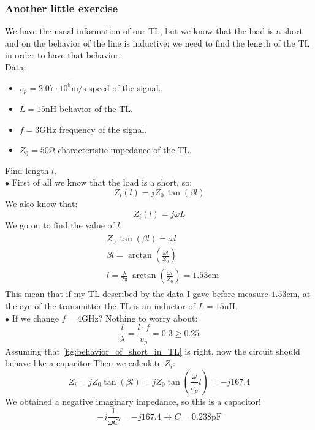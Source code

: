 \subsubsection*{Another little exercise}
We have the usual information of our TL, but we know that the load is a short and on the behavior of the line is inductive; we need to find the length of the TL in order to have that behavior.\\
Data:
\begin{itemize}
    \item $v_p=2.07\cdot 10^{8}\si{\metre \per \second}$ speed of the signal.
    \item $L=15\si{\nano\henry}$ behavior of the TL.
    \item $f=3\si{\giga\hertz}$ frequency of the signal.
    \item $Z_0=50\si{\ohm}$ characteristic impedance of the TL.
\end{itemize}
Find length $l$.\\
$\bullet$ First of all we know that the load is a short, so:
\begin{equation*}
    Z_i(l)=jZ_0\, \tan(\beta l)
\end{equation*}
We also know that:
\begin{equation*}
    Z_i(l)=j\omega L
\end{equation*}
We go on to find the value of $l$:
\begin{align*}
    \begin{split}
      &Z_0\,\tan(\beta l)=\omega l\\[5pt]
      &\beta l=\arctan(\frac{\omega l}{Z_0})\\[5pt]
      &l=\frac{\lambda}{2\pi}\,\arctan(\frac{\omega l}{Z_0})=1.53\si{\centi\metre}
    \end{split}
\end{align*}
This mean that if my TL described by the data I gave before measure $1.53\si{\centi\metre}$, at the eye of the transmitter the TL is an inductor of $L=15\si{\nano\henry}$.\\
$\bullet$ If we change $f=4\si{\giga\hertz}$? Nothing to worry about:
\begin{equation*}
    \frac{l}{\lambda}=\frac{l\cdot f}{v_p}=0.3\geq 0.25
\end{equation*}
Assuming that \cref{fig:behavior_of_short_in_TL} is right, now the circuit should behave like a capacitor
Then we calculate $Z_i$:
\begin{equation*}
    Z_i=jZ_0\tan(\beta l)=jZ_0\tan(\frac{\omega}{v_p} l)=-j167.4
\end{equation*}
We obtained a negative imaginary impedance, so this is a capacitor!
\begin{equation*}
    -j\frac{1}{\omega C}=-j167.4 \rightarrow C=0.238\si{\pico\farad}
\end{equation*}
